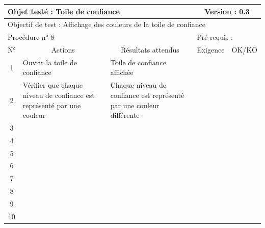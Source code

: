 \documentclass{../res/univ-projet}
\begin{document}
\begin{center}
    \begin{tabular}{|c|p{5cm}|p{5cm}|p{1.5cm}|p{1.5cm}|}
      \hline
      \multicolumn{3}{|l|}{Objet testé : Toile de confiance} & \multicolumn{2}{c|}{Version : 0.3}\\ \hline
      \multicolumn{5}{|l|}{Objectif de test : Affichage des couleurs de la toile de confiance}\\ \hline
      \multicolumn{3}{|l|}{Procédure n° 8} & \multicolumn{2}{p{3cm}|}{Pré-requis : }\\ \hline
      \multicolumn{1}{|c|}{N°} & \multicolumn{1}{c|}{Actions} & \multicolumn{1}{c|}{Résultats attendus} & 
      \multicolumn{1}{c|}{Exigence} & \multicolumn{1}{c|}{OK/KO}\\ \hline
      1 & Ouvrir la toile de confiance & Toile de confiance affichée &  & \\
      2 & Vérifier que chaque niveau de confiance est représenté par une couleur & Chaque niveau de confiance est représenté par une couleur différente &  & \\
      3 &  &  &  & \\ 
	  4 &  &  &  & \\
      5 &  &  &  & \\
	  6 &  &  &  & \\
      7 &  &  &  & \\
      8 &  &  &  & \\
      9 &  &  &  & \\
      10 &  &  &  &\\ 
	\hline
    \end{tabular}
    \vskip 2.2cm
    

\end{center}
\end{document}
